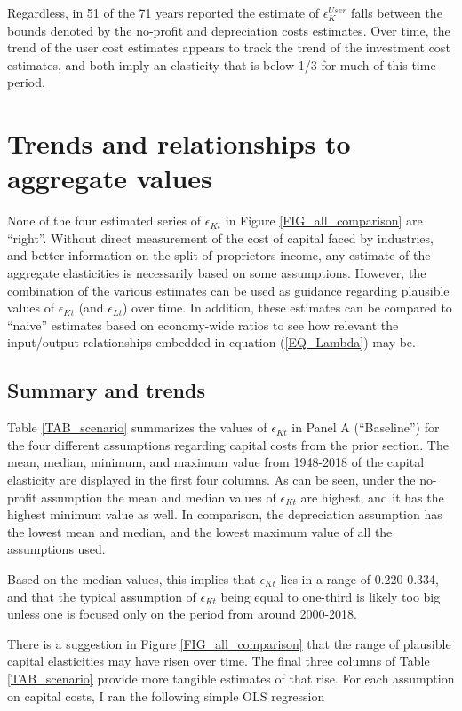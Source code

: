 \documentclass[11pt]{article}
\begin{document}
Regardless, in 51 of the 71 years reported the estimate of $\epsilon_K^{User}$ falls between the bounds denoted by the no-profit and depreciation costs estimates. Over time, the trend of the user cost estimates appears to track the trend of the investment cost estimates, and both imply an elasticity that is below 1/3 for much of this time period. 

\section{Trends and relationships to aggregate values}
None of the four estimated series of $\epsilon_{Kt}$ in Figure \ref{FIG_all_comparison} are ``right''. Without direct measurement of the cost of capital faced by industries, and better information on the split of proprietors income, any estimate of the aggregate elasticities is necessarily based on some assumptions. However, the combination of the various estimates can be used as guidance regarding plausible values of $\epsilon_{Kt}$ (and $\epsilon_{Lt}$) over time. In addition, these estimates can be compared to ``naive'' estimates based on economy-wide ratios to see how relevant the input/output relationships embedded in equation (\ref{EQ_Lambda}) may be.

\subsection{Summary and trends}
Table \ref{TAB_scenario} summarizes the values of $\epsilon_{Kt}$ in Panel A (``Baseline'') for the four different assumptions regarding capital costs from the prior section. The mean, median, minimum, and maximum value from 1948-2018 of the capital elasticity are displayed in the first four columns. As can be seen, under the no-profit assumption the mean and median values of $\epsilon_{Kt}$ are highest, and it has the highest minimum value as well. In comparison, the depreciation assumption has the lowest mean and median, and the lowest maximum value of all the assumptions used. 

Based on the median values, this implies that $\epsilon_{Kt}$ lies in a range of 0.220-0.334, and that the typical assumption of $\epsilon_{Kt}$ being equal to one-third is likely too big unless one is focused only on the period from around 2000-2018.

There is a suggestion in Figure \ref{FIG_all_comparison} that the range of plausible capital elasticities may have risen over time. The final three columns of Table \ref{TAB_scenario} provide more tangible estimates of that rise. For each assumption on capital costs, I ran the following simple OLS regression
\end{document}
